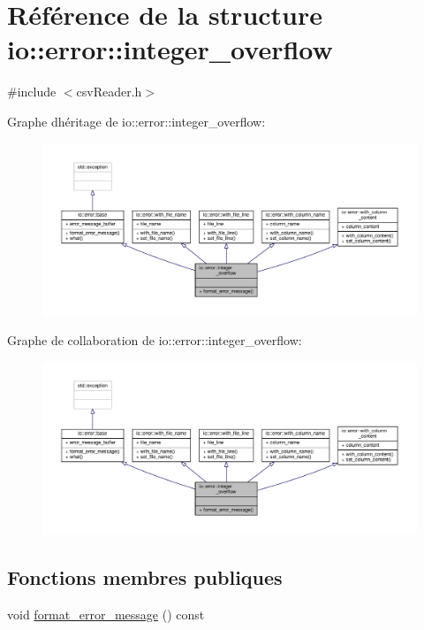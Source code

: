 \hypertarget{structio_1_1error_1_1integer__overflow}{}\section{Référence de la structure io\+:\+:error\+:\+:integer\+\_\+overflow}
\label{structio_1_1error_1_1integer__overflow}


{\ttfamily \#include $<$csv\+Reader.\+h$>$}



Graphe d\textquotesingle{}héritage de io\+:\+:error\+:\+:integer\+\_\+overflow\+:\nopagebreak
\begin{figure}[H]
\begin{center}
\leavevmode
\includegraphics[width=350pt]{structio_1_1error_1_1integer__overflow__inherit__graph}
\end{center}
\end{figure}


Graphe de collaboration de io\+:\+:error\+:\+:integer\+\_\+overflow\+:\nopagebreak
\begin{figure}[H]
\begin{center}
\leavevmode
\includegraphics[width=350pt]{structio_1_1error_1_1integer__overflow__coll__graph}
\end{center}
\end{figure}
\subsection*{Fonctions membres publiques}
\begin{DoxyCompactItemize}
\item 
void \hyperlink{structio_1_1error_1_1integer__overflow_a25825600c3c29210160ba201519e6312}{format\+\_\+error\+\_\+message} () const
\end{DoxyCompactItemize}
